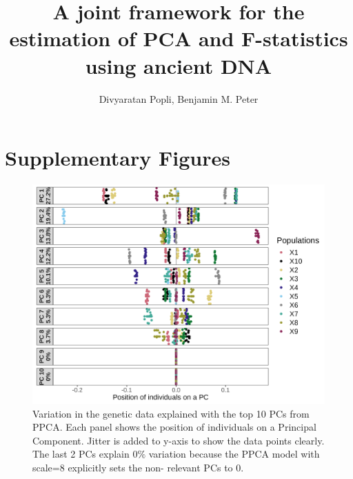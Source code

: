\documentclass[12pt, letterpaper]{article}
\title{A joint framework for the estimation of PCA and F-statistics using ancient DNA}
\author{Divyaratan Popli, Benjamin M. Peter}
\begin{document}
\maketitle
\section*{Supplementary Figures}
\renewcommand{\figurename}{Fig S}


\begin{figure}[ht!]
    \includegraphics[width=16.5cm]{Images/Supplement/pcplot2.png}
    \centering
    \caption{Variation in the genetic data explained with the top 10 PCs from PPCA. Each panel shows the position of individuals on a Principal Component. Jitter is added to y-axis to show the data points clearly. The last 2 PCs explain $0\%$ variation because the PPCA model with scale=8 explicitly sets the non- relevant PCs to 0.}
    \label{figS1:pc_scale}
\end{figure}
\end{document}
